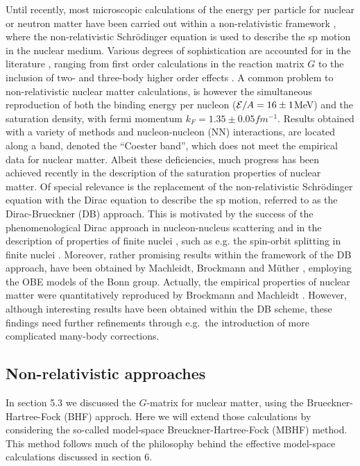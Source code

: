 Until recently, most microscopic calculations of the energy per particle
for nuclear or neutron matter have been carried out within a
non-relativistic framework \cite{mah85,km83,wff88},
where the non-relativistic Schr\"{o}dinger equation is used to describe the
sp motion in the nuclear medium. Various degrees of
sophistication are accounted for in the literature \cite{mac89},
ranging from first order calculations in the reaction matrix $G$ to the
inclusion of two- and three-body higher order
effects \cite{dm92,mah85,km83,wff88}.
A common problem to non-relativistic nuclear matter calculations, is
however the
simultaneous reproduction of both the binding energy per nucleon
(${\cal E}/A=16\pm 1 $MeV) and the saturation density, with fermi momentum
$k_F=1.35\pm 0.05 fm^{-1}$.
Results obtained with a variety of methods and nucleon-nucleon (NN)
interactions, are located along a band,
denoted the ``Coester band'', which
does not meet the empirical data for nuclear matter.
Albeit these deficiencies, much progress has been achieved recently
in the description of the saturation properties of nuclear matter.
Of special relevance is the replacement of the non-relativistic
Schr\"{o}dinger equation with the Dirac equation to describe the
sp motion, referred to as the Dirac-Brueckner (DB)
approach.
This is motivated by the success of the
phenomenological Dirac approach in nucleon-nucleus scattering
\cite{ray91} and in the description of properties of finite nuclei
\cite{hnm92}, such as e.g. the spin-orbit splitting
in finite nuclei \cite{br78}. Moreover, rather promising results
within the framework of the DB approach, have been obtained by Machleidt,
Brockmann and M\"{u}ther \cite{bm90,mmb90,lmb92}, employing the
OBE models of the Bonn group. Actually, the empirical properties
of nuclear matter were quantitatively reproduced by Brockmann
and Machleidt \cite{bm90}. However, although interesting results
have been obtained within the DB scheme, these findings need further
refinements through e.g.\ the introduction of more
complicated many-body corrections.


\subsection{Non-relativistic approaches}

In section 5.3 we discussed the $G$-matrix for nuclear matter,
using the Brueckner-Hartree-Fock (BHF) approch. Here we will extend 
those calculations by considering the so-called model-space
Breuckner-Hartree-Fock (MBHF) method. This method follows much of
the philosophy behind the effective model-space calculations
discussed in section 6.


